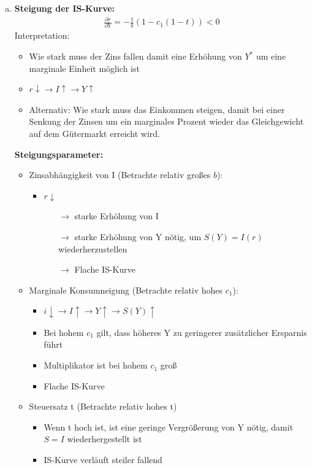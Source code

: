 \documentclass{scrartcl}
\begin{document}
\begin{enumerate}[(a)]
\item
\textbf{Steigung der IS-Kurve:}
\begin{align*}
  \frac{\partial r}{\partial Y} = -\frac{1}{b}(1-c_1(1-t))<0
\end{align*}
Interpretation:
\begin{itemize}
  \item Wie stark muss der Zins fallen damit eine Erh\"{o}hung von $Y^*$ um eine marginale Einheit m\"{o}glich ist
  \item $r\downarrow \rightarrow I\uparrow\rightarrow Y \uparrow$
  \item Alternativ: Wie stark muss das Einkommen steigen, damit bei einer Senkung der Zinsen um ein marginales Prozent wieder das Gleichgewicht auf dem G\"{u}termarkt erreicht wird.
\end{itemize}
\textbf{Steigungsparameter:}
\begin{itemize}
\item Zinsabh\"{a}ngigkeit von I (Betrachte relativ gro{\ss}es $b$):
\begin{itemize}
  \item $r\downarrow$
  \begin{itemize}
  \item[$\rightarrow$] starke Erh\"{o}hung von I
  \item[$\rightarrow$] starke Erh\"{o}hung von Y n\"{o}tig, um $S(Y)=I(r)$ wiederherzustellen
  \item[$\rightarrow$] Flache IS-Kurve
  \end{itemize}
\end{itemize}
\item Marginale Konsumneigung (Betrachte relativ hohes $c_1$):
\begin{itemize}
  \item $i\downarrow\rightarrow I\uparrow \rightarrow Y\uparrow \rightarrow S(Y) \uparrow$
  \item Bei hohem $c_1$ gilt, dass h\"{o}heres Y zu geringerer zus\"{a}tzlicher Ersparnis f\"{u}hrt
  \item Multiplikator ist bei hohem $c_1$ gro{\ss}
  \item Flache IS-Kurve
\end{itemize}
\item Steuersatz t (Betrachte relativ hohes t)
\begin{itemize}
  \item Wenn t hoch ist, ist eine geringe Vergr\"{o}{\ss}erung von Y n\"{o}tig, damit $S=I$ wiederhergestellt ist
  \item IS-Kurve verl\"{a}uft steiler fallend

\end{itemize}
\end{itemize}
\end{enumerate}
\end{document}
